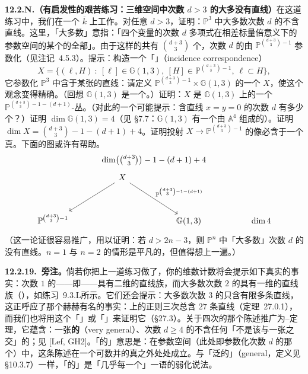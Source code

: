 \textbf{12.2.N.（有启发性的艰苦练习：三维空间中次数 $d>3$ 的\trSurface{}大多没有直线）}\quad 在这道练习中，我们在一个\trAlgClosedField{} $\overline{k}$ 上工作。对任意 $d>3$，证明：$\mathbb{P}^3$ 中大多数次数 $d$ 的\trSurface{}不含直线。这里，「大多数」意指：「四个变量的次数 $d$ \trHomogeneous{}多项式在相差标量倍意义下的参数空间的某个\trZariski\trOpenSet{}的全部\trClosedPoint」。由于这样的\trMonomial{}共有 $\binom{d+3}{3}$ 个，次数 $d$ 的\trHypersurface{}由 $\mathbb{P}^{\binom{d+3}{3}-1}$ 参数化（见注记~4.5.3）。提示：构造一个「\trIncidenceCorrespondence」（incidence correspondence）
\[
X=\{(\ell,H)\ :\ [\ell]\in\mathbb{G}(1,3),\ [H]\in\mathbb{P}^{\binom{d+3}{3}-1},\ \ell\subset H\},
\]
它参数化 $\mathbb{P}^3$ 中含于某张\trHypersurface{}的直线：请定义 $\mathbb{P}^{\binom{d+3}{3}-1}\times\mathbb{G}(1,3)$ 的一个\trClosedSubscheme{} $X$，使这个观念变得精确。（回想 $\mathbb{G}(1,3)$ 是一个\trGrassmannian。）证明：$X$ 是 $\mathbb{G}(1,3)$ 上的一个 $\mathbb{P}^{\binom{d+3}{3}-1-(d+1)}$-丛。（对此的一个可能提示：含直线 $x=y=0$ 的次数 $d$ \trHypersurface{}有多少个？）证明 $\dim\mathbb{G}(1,3)=4$（见 \S7.7：$\mathbb{G}(1,3)$ 有一个由 $\mathbb{A}^4$ 组成的\trOpenCover）。证明 $\dim X=\binom{d+3}{3}-1-(d+1)+4$。证明投射 $X\to\mathbb{P}^{\binom{d+3}{3}-1}$ 的像必含于一个真\trClosedSubset。下面的图或许有帮助。
\[
\dim\bigl(\tbinom{d+3}{3}\bigr)-1-(d+1)+4
\]
\[
\begin{tikzcd}[row sep=3.4em, column sep=5.2em]
& X \ar[dl] \ar[dr, "\mathbb{P}^{\binom{d+3}{3}-1-(d+1)}"] & \\
\mathbb{P}^{\binom{d+3}{3}-1} & & \mathbb{G}(1,3) & \dim 4
\end{tikzcd}
\]
（这一论证很容易推广，用以证明：若 $d>2n-3$，则 $\mathbb{P}^n$ 中「大多数」次数 $d$ 的\trHypersurface{}没有直线。$n=1$ 与 $n=2$ 的情形是平凡的，但值得想上一遍。）

\textbf{12.2.19.\ 旁注。}\quad 倘若你把上一道练习做了，你的维数计数将会提示如下真实的事实：次数 $1$ 的\trHypersurface——即\trHyperplane——具有二维的直线族，而大多数次数 $2$ 的\trHypersurface{}具有一维的直线族（\trRuling），如\mbox{练习~9.3.L}所示。它们还会提示：大多数次数 $3$ 的\trHypersurface{}只含有限多条直线，这正呼应了那个赫赫有名的事实：\trAlgClosedField{}上的正则三次\trSurface{}总含 $27$ 条直线（定理~27.0.1），而我们也将用这个「\trIncidenceCorrespondence」或「\trIncidenceVariety」来证明它（\S27.3）。关于四次\trSurface{}的那个陈述推广为\trNoether{}--\trLefschetz{}定理，它蕴含：一张\textbf{\trVeryGeneral{}的}（very general）、次数 $d\ge4$ 的\trSurface{}不含任何「不是该\trSurface{}与一张\trHypersurface{}之交」的\trCurve；见 [Lef, GH2]。「\trVeryGeneral{}的」意思是：在参数空间（此处即参数化次数 $d$ \trSurface{}的那个\trProjectiveSpace）中，这条陈述在一个可数并的真\trZariski\trClosedSubset{}之外处处成立。与「泛的」（general，定义见 \S10.3.7）一样，「\trVeryGeneral{}的」是「几乎每一个」一语的弱化说法。

